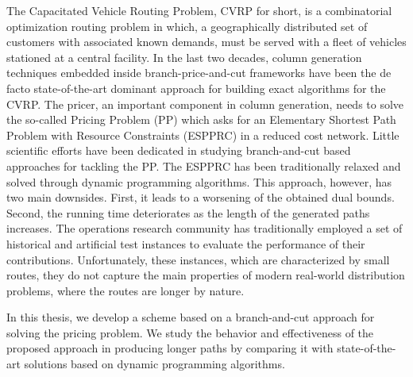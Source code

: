 
\noindent The Capacitated Vehicle Routing Problem, CVRP for short,
is a combinatorial optimization routing problem in which,
a geographically distributed set of customers with associated known demands,
must be served with a fleet of vehicles stationed at a central facility.
In the last two decades,
column generation techniques embedded inside branch-price-and-cut frameworks
have been the de facto state-of-the-art dominant approach
for building exact algorithms for the CVRP.
The pricer, an important component in column generation, needs to solve
the so-called Pricing Problem (PP) which asks for an
Elementary Shortest Path Problem with Resource Constraints (ESPPRC)
in a reduced cost network.
Little scientific efforts have been dedicated in studying
branch-and-cut based approaches for tackling the PP.
The ESPPRC has been traditionally relaxed and solved through dynamic programming
algorithms.
This approach, however, has two main downsides.
First, it leads to a worsening of the obtained dual bounds.
Second, the running time deteriorates as the length of the generated paths increases.
The operations research community has traditionally employed
a set of historical and artificial test instances to evaluate
the performance of their contributions.
Unfortunately, these instances, which are characterized by small routes,
they do not capture the main properties of modern real-world distribution problems,
where the routes are longer by nature.

\noindent In this thesis, we develop
a scheme based on a branch-and-cut approach for solving the pricing problem.
We study the behavior and effectiveness of the proposed approach in producing longer paths
by comparing it with state-of-the-art solutions based on dynamic programming algorithms.
